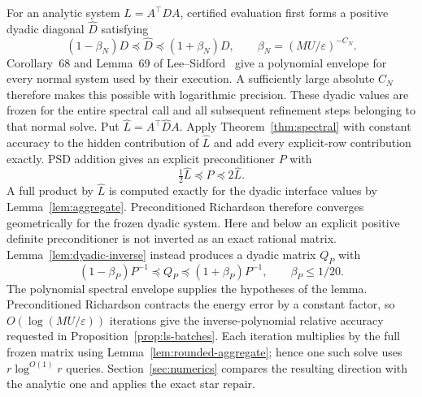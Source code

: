 \documentclass[11pt]{article}
\theoremstyle{definition}
\newcommand{\eps}{\varepsilon}
\begin{document}
For an analytic system $L=A^\top DA$, certified evaluation first forms a
positive dyadic diagonal $\widehat D$ satisfying
\begin{equation}\label{eq:dyadic-diagonal}
        (1-\beta_N)D\preceq\widehat D\preceq(1+\beta_N)D,
        \qquad \beta_N=(MU/\eps)^{-C_N}.
\end{equation}
Corollary~68 and Lemma~69 of Lee--Sidford~\cite{LeeSidford2020} give a
polynomial envelope for every normal system used by their execution.  A
sufficiently large absolute $C_N$ therefore makes this possible with
logarithmic precision.
These dyadic values are frozen for the entire spectral call and all
subsequent refinement steps belonging to that normal solve.  Put
$\widehat L=A^\top\widehat DA$.  Apply
Theorem~\ref{thm:spectral} with constant accuracy to the hidden contribution
of $\widehat L$ and add every explicit-row contribution exactly.  PSD addition
gives an explicit preconditioner $P$ with
\[
        \tfrac12\widehat L\preceq P\preceq2\widehat L .
\]
A full product by $\widehat L$ is computed exactly for the dyadic interface
values by Lemma~\ref{lem:aggregate}.  Preconditioned Richardson therefore
converges geometrically for the frozen dyadic system.  Here and below an
explicit positive definite preconditioner is not inverted as an exact
rational matrix.  Lemma~\ref{lem:dyadic-inverse} instead produces a
dyadic matrix $Q_P$ with
\begin{equation}\label{eq:dyadic-preconditioner-inverse}
 (1-\beta_P)P^{-1}\preceq Q_P\preceq(1+\beta_P)P^{-1},
 \qquad \beta_P\le1/20 .
\end{equation}
The polynomial spectral envelope supplies the hypotheses of the lemma.
Preconditioned Richardson contracts the energy error by a constant factor,
so $O(\log(MU/\eps))$ iterations give the inverse-polynomial relative
accuracy requested in Proposition~\ref{prop:ls-batches}.  Each iteration
multiplies by the full frozen matrix using
Lemma~\ref{lem:rounded-aggregate}; hence one such solve uses
$r\log^{O(1)}r$ queries.  Section~\ref{sec:numerics} compares the resulting
direction with the analytic one and applies the exact star repair.
\end{document}
